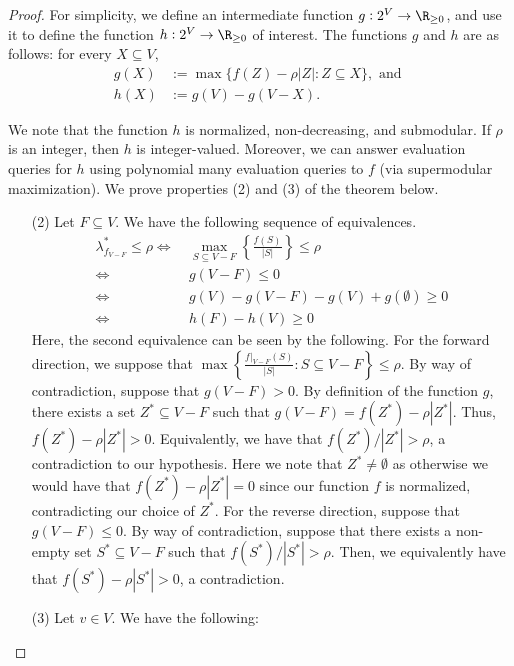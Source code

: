 \documentclass{article}
\begin{document}
\thmsddsToSubmodCover*
\begin{proof}
For simplicity, we define an intermediate function $g:2^V\rightarrow\R_{\geq 0}$, and use it to define the function $h:2^V\rightarrow\R_{\geq 0}$ of interest. The functions $g$ and $h$ are as follows: for every $X \subseteq V$,
\begin{align*}
    g(X) &:= \max\{f(Z) - \rho|Z| : Z \subseteq X\}, \text{ and }\\
    h(X) & := g(V) - g(V - X).
\end{align*}

We note that the function $h$ is normalized, non-decreasing, and submodular. If $\rho$ is an integer, then $h$ is integer-valued. Moreover, we  can answer evaluation queries for $h$ using polynomial many evaluation queries to $f$ (via supermodular maximization). 
We prove properties (2) and (3) of the theorem below.
\begin{enumerate}
    \item[(2)] Let $F\subseteq V$. We have the following sequence of equivalences.
    \begin{align*}
        \lambda^*_{f_{V - F}} \leq \rho \Leftrightarrow\  & \max_{S\subseteq V - F}\left\{\frac{f(S)}{|S|}\right\} \leq \rho\\
\Leftrightarrow\ & g(V - F) \leq 0 \\
        \Leftrightarrow\ & g(V) - g(V - F) - g(V) + g(\emptyset) \geq 0\\
    \Leftrightarrow\ & h(F) - h(V) \geq 0
    \end{align*}
    Here, the second equivalence can be seen by the following. 
    For the forward direction, we suppose that $ \max\left\{\frac{f|_{V - F}(S)}{|S|} : S\subseteq V - F\right\} \leq \rho$. By way of contradiction, suppose that $g(V - F) > 0$. By definition of the function $g$, there exists a set $Z^* \subseteq V-F$ such that $g(V - F) = f(Z^*) - \rho|Z^*|$. Thus, $f(Z^*) - \rho|Z^*| > 0$. Equivalently, we have that $f(Z^*)/|Z^*| > \rho$, a contradiction to our hypothesis. Here we note that $Z^* \not = \emptyset$ as otherwise we would have that $f(Z^*) - \rho|Z^*| = 0$ since our function $f$ is normalized, contradicting our choice of $Z^*$. For the reverse direction, suppose that $g(V - F) \leq 0$. By way of contradiction, suppose that there exists a non-empty set $S^* \subseteq V - F$ such that $f(S^*)/|S^*| > \rho$. Then, we equivalently have that $f(S^*) - \rho|S^*| > 0$, a contradiction.
    \item[(3)] Let $v \in V$. We have the following:

\end{enumerate}
\end{proof}
\end{document}
